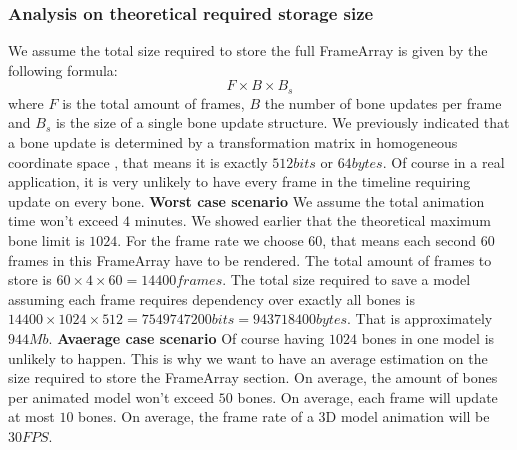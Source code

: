 \subsubsection{Analysis on theoretical required storage size}
We assume the total size required to store the full FrameArray is given by the following formula:
\begin{equation}
    F \times B \times B_s
\end{equation}
where $F$ is the total amount of frames, $B$ the number of bone updates per frame and $B_s$ is the size of a single bone update structure.\newline
We previously indicated that a bone update is determined by a transformation matrix in homogeneous coordinate space \cite{HomogeneousCoordinates}, that means it is exactly $512bits$ or $64bytes$.\newline
Of course in a real application, it is very unlikely to have every frame in the timeline requiring update on every bone.\newline
\newline\textbf{Worst case scenario}\newline
We assume the total animation time won't exceed $4$ minutes.\newline
We showed earlier that the theoretical maximum bone limit is $1024$.\newline
For the frame rate we choose $60$, that means each second $60$ frames in this FrameArray have to be rendered.\newline
The total amount of frames to store is $60 \times 4 \times 60 = 14400frames$.\newline
The total size required to save a model assuming each frame requires dependency over exactly all bones is $14400 \times 1024 \times 512 = 7549747200bits = 943718400bytes$. That is approximately $944Mb$.\newline
\newline\textbf{Avaerage case scenario}\newline
Of course having $1024$ bones in one model is unlikely to happen. This is why we want to have an average estimation on the size required to store the FrameArray section.\newline
On average, the amount of bones per animated model won't exceed $50$ bones.\newline
On average, each frame will update at most $10$ bones.\newline
On average, the frame rate of a 3D model animation will be $30FPS$.\newline
